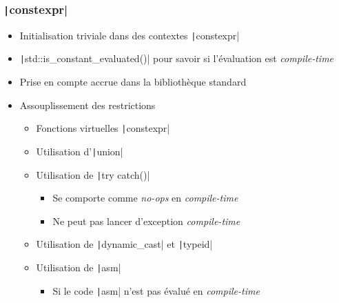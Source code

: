 \documentclass[C++.tex]{subfiles}
\begin{document}
\begin{frame}[fragile]
	\frametitle{\texttt|constexpr|}
	\begin{itemize}
		\item Initialisation triviale dans des contextes \texttt|constexpr|
		\item \texttt|std::is_constant_evaluated()| pour savoir si l'évaluation est \textit{compile-time}
		\item Prise en compte accrue dans la bibliothèque standard
		\item Assouplissement des restrictions
		\begin{itemize}
			\item Fonctions virtuelles \texttt|constexpr|
			\item Utilisation d'\texttt|union|
			\item Utilisation de \texttt|try {} catch()|
			\begin{itemize}
				\item Se comporte comme \textit{no-ops} en \textit{compile-time}
				\item Ne peut pas lancer d'exception \textit{compile-time}
			\end{itemize}
			\item Utilisation de \texttt|dynamic_cast| et \texttt|typeid|
			\item Utilisation de \texttt|asm|
			\begin{itemize}
				\item Si le code \texttt|asm| n'est pas évalué en \textit{compile-time}
			\end{itemize}
		\end{itemize}
	\end{itemize}

\end{frame}
\end{document}
